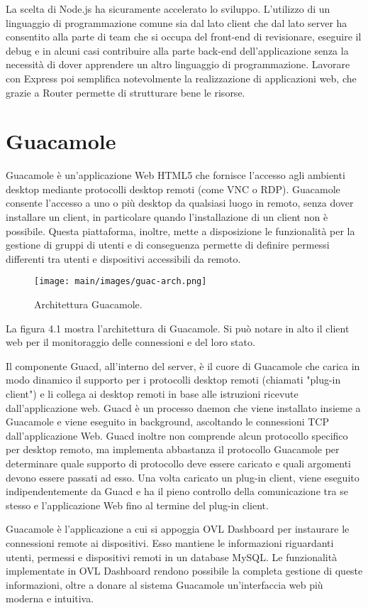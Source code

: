 La scelta di Node.js ha sicuramente accelerato lo sviluppo. L’utilizzo di un linguaggio di programmazione comune sia dal lato client che dal lato server ha consentito alla parte di team che si occupa del front-end di revisionare, eseguire il debug e in alcuni casi contribuire alla parte back-end dell'applicazione senza la necessità di dover apprendere un altro linguaggio di programmazione. Lavorare con Express poi semplifica notevolmente la realizzazione di applicazioni web, che grazie a Router permette di strutturare bene le risorse.

\section{Guacamole}
\label{sec:guacamole}

Guacamole è un'applicazione Web HTML5 che fornisce l'accesso agli ambienti desktop mediante protocolli desktop remoti (come VNC o RDP). Guacamole consente l'accesso a uno o più desktop da qualsiasi luogo in remoto, senza dover installare un client, in particolare quando l'installazione di un client non è possibile. Questa piattaforma, inoltre, mette a disposizione le funzionalità per la gestione di gruppi di utenti e di conseguenza permette di definire permessi differenti tra utenti e dispositivi accessibili da remoto. 

\begin{figure}
\begin{center}
\texttt{[image: main/images/guac-arch.png]}
\end{center}
\caption{Architettura Guacamole.}
\label{fig:lifecycleComponent}
\end{figure}

La figura 4.1 mostra l'architettura di Guacamole. Si può notare in alto il client web per il monitoraggio delle connessioni e del loro stato. 

Il componente Guacd, all'interno del server, è il cuore di Guacamole che carica in modo dinamico il supporto per i protocolli desktop remoti (chiamati "plug-in client") e li collega ai desktop remoti in base alle istruzioni ricevute dall'applicazione web.
Guacd è un processo daemon che viene installato insieme a Guacamole e viene eseguito in background, ascoltando le connessioni TCP dall'applicazione Web. Guacd inoltre non comprende alcun protocollo specifico per desktop remoto, ma implementa abbastanza il protocollo Guacamole per determinare quale supporto di protocollo deve essere caricato e quali argomenti devono essere passati ad esso. Una volta caricato un plug-in client, viene eseguito indipendentemente da Guacd e ha il pieno controllo della comunicazione tra se stesso e l'applicazione Web fino al termine del plug-in client.

Guacamole è l'applicazione a cui si appoggia OVL Dashboard per instaurare le connessioni remote ai dispositivi. Esso mantiene le informazioni riguardanti utenti, permessi e dispositivi remoti in un database MySQL. Le funzionalità implementate in OVL Dashboard rendono possibile la completa gestione di queste informazioni, oltre a donare al sistema Guacamole un'interfaccia web più moderna e intuitiva.